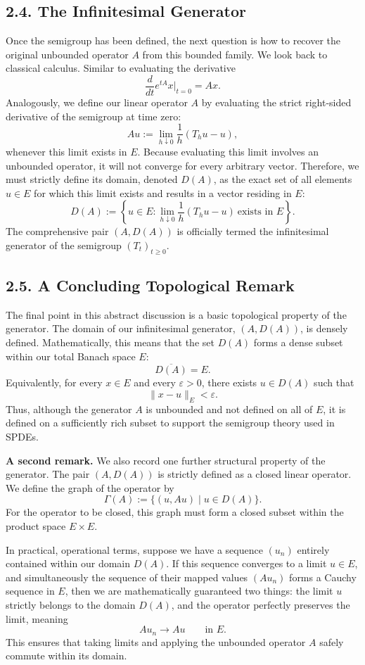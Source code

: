 \documentclass[11pt]{article}
\theoremstyle{definition}
\theoremstyle{remark}
\begin{document}
\subsection*{2.4. The Infinitesimal Generator}
Once the semigroup has been defined, the next question is how to recover the original unbounded operator \(A\) from this bounded family. We look back to classical calculus. Similar to evaluating the derivative
\[
\frac{d}{dt}e^{tA}x\bigg|_{t=0}=Ax.
\]
Analogously, we define our linear operator \(A\) by evaluating the strict right-sided derivative of the semigroup at time zero:
\[
Au
:=
\lim_{h\downarrow 0}\frac{1}{h}(T_hu-u),
\]
whenever this limit exists in \(E\). Because evaluating this limit involves an unbounded operator, it will not converge for every arbitrary vector. Therefore, we must strictly define its domain, denoted \(D(A)\), as the exact set of all elements \(u\in E\) for which this limit exists and results in a vector residing in \(E\):
\[
D(A)
:=
\left\{u\in E:\lim_{h\downarrow 0}\frac{1}{h}(T_hu-u)\ \text{exists in }E\right\}.
\]
The comprehensive pair \((A,D(A))\) is officially termed the infinitesimal generator of the semigroup \((T_t)_{t\ge 0}\).

\subsection*{2.5. A Concluding Topological Remark}
The final point in this abstract discussion is a basic topological property of the generator. The domain of our infinitesimal generator, \((A,D(A))\), is densely defined. Mathematically, this means that the set \(D(A)\) forms a dense subset within our total Banach space \(E\):
\[
\overline{D(A)}=E.
\]
Equivalently, for every \(x\in E\) and every \(\varepsilon>0\), there exists \(u\in D(A)\) such that
\[
\|x-u\|_E<\varepsilon.
\]
Thus, although the generator \(A\) is unbounded and not defined on all of \(E\), it is defined on a sufficiently rich subset to support the semigroup theory used in SPDEs.

\medskip

\noindent\textbf{A second remark.} We also record one further structural property of the generator. The pair \((A,D(A))\) is strictly defined as a closed linear operator. We define the graph of the operator by
\[
\Gamma(A):=\{(u,Au)\mid u\in D(A)\}.
\]
For the operator to be closed, this graph must form a closed subset within the product space \(E\times E\).

In practical, operational terms, suppose we have a sequence \((u_n)\) entirely contained within our domain \(D(A)\). If this sequence converges to a limit \(u\in E\), and simultaneously the sequence of their mapped values \((Au_n)\) forms a Cauchy sequence in \(E\), then we are mathematically guaranteed two things: the limit \(u\) strictly belongs to the domain \(D(A)\), and the operator perfectly preserves the limit, meaning
\[
Au_n\to Au
\qquad \text{in } E.
\]
This ensures that taking limits and applying the unbounded operator \(A\) safely commute within its domain.
\end{document}
